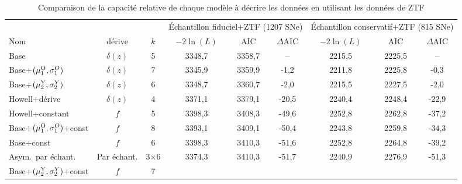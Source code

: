 \documentclass[../main/main.tex]{subfiles}
\begin{document}
\begin{landscape}
\begin{table}[p]
    \centerfloat
    \begin{threeparttable}
        \caption[Comparaison de la capacité relative de chaque modèle à décrire
        les données par rapport au modèle de base avec les données de
        ZTF]{Comparaison de la capacité relative de chaque modèle à décrire les
        données en utilisant les données de ZTF}
            \label{tab:comp_ztf}
        \begin{tabular}{lcccccccc}
            \toprule
            & & & \multicolumn{3}{c}{Échantillon fiduciel+ZTF (1207 SNe)}
                & \multicolumn{3}{c}{Échantillon conservatif+ZTF (815 SNe)} \\
            \cmidrule(lr){4-6} \cmidrule(lr){7-9}
            Nom & dérive & $k$ &
            $-2\ln(L)$ & AIC & $\Delta$AIC & $-2\ln(L)$ & AIC & $\Delta$AIC\\
            \midrule
            Base & $\delta(z)$ & 5
            & 3348,7 & 3358,7 & -- 
            & 2215,5 & 2225,5 & -- \\
            Base+$(\mu_1^{\rm O},\sigma_1^{O})$ & $\delta(z)$ & 7
            & 3345,9 & 3359,9 & -1,2 
            & 2211,8 & 2225,8 & -0,3 \\
            Base+$(\mu_2^{\rm Y},\sigma_2^{Y})$ & $\delta(z)$ & 6
            & 3348,7 & 3360,7 & -2,0 
            & 2215,5 & 2227,5 & -2,0 \\
            Howell+dérive & $\delta(z)$ & 4
            & 3371,1 & 3379,1 & -20,5
            & 2240,4 & 2248,4 & -22,9 \\
            Howell+constant & $f$ & 5
            & 3398,3 & 3408,3 & -49,6
            & 2252,8 & 2262,8 & -37,2 \\
            Base+$(\mu_1^{\rm O},\sigma_1^{O})$+const & $f$ & 8
            & 3393,1 & 3409,1 & -50,4
            & 2243,8 & 2259,8 & -34,3 \\
            Base+const & $f$ & 6
            & 3398,3 & 3410,3 & -51,6
            & 2252,8 & 2264,8 & -39,2 \\
            Asym.\ par échant. & Par échant. & 3$\times$6
            & 3374,3 & 3410,3  & -51,7
            & 2240,9 & 2276,9  & -51,3 \\
            Base+$(\mu_2^{\rm Y},\sigma_2^{Y})$+const & $f$ & 7

\end{tabular}
\end{threeparttable}
\end{table}
\end{landscape}
\end{document}
